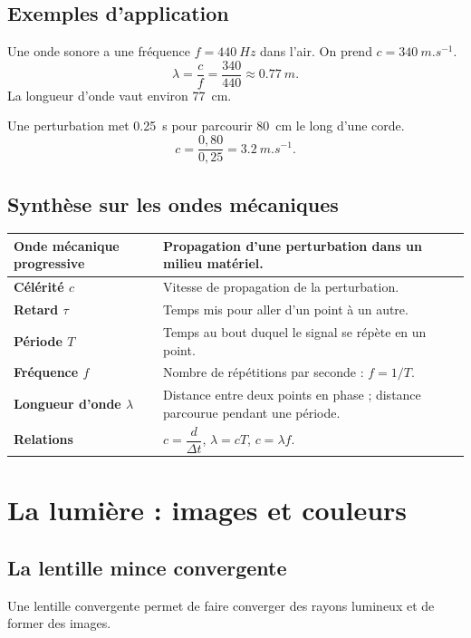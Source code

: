 \documentclass[11pt,a4paper]{article}
\begin{document}
\subsection{Exemples d'application}

\begin{exemplebox}
Une onde sonore a une fréquence $f=\SI{440}{Hz}$ dans l'air. On prend $c=\SI{340}{m.s^{-1}}$.
\[
\lambda=\frac{c}{f}=\frac{340}{440}\approx \SI{0,77}{m}.
\]
La longueur d'onde vaut environ \SI{77}{cm}.
\end{exemplebox}

\begin{exemplebox}
Une perturbation met \SI{0,25}{s} pour parcourir \SI{80}{cm} le long d'une corde.
\[
c=\frac{0,80}{0,25}=\SI{3,2}{m.s^{-1}}.
\]
\end{exemplebox}

\subsection{Synthèse sur les ondes mécaniques}
\begin{center}
\renewcommand{\arraystretch}{1.35}
\begin{tabularx}{\linewidth}{|>{\bfseries}m{4.1cm}|X|}
\hline
Onde mécanique progressive & Propagation d'une perturbation dans un milieu matériel. \\
\hline
Célérité $c$ & Vitesse de propagation de la perturbation. \\
\hline
Retard $\tau$ & Temps mis pour aller d'un point à un autre. \\
\hline
Période $T$ & Temps au bout duquel le signal se répète en un point. \\
\hline
Fréquence $f$ & Nombre de répétitions par seconde : $f=1/T$. \\
\hline
Longueur d'onde $\lambda$ & Distance entre deux points en phase ; distance parcourue pendant une période. \\
\hline
Relations & $c=\dfrac{d}{\Delta t}$, $\lambda=cT$, $c=\lambda f$. \\
\hline
\end{tabularx}
\end{center}

\section{La lumière : images et couleurs}

\subsection{La lentille mince convergente}
Une lentille convergente permet de faire converger des rayons lumineux et de former des images.
\end{document}
